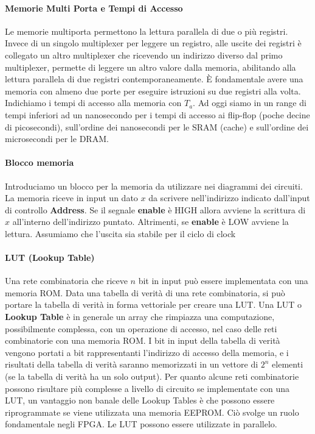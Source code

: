 \paragraph{Memorie Multi Porta e Tempi di Accesso}
Le memorie multiporta permettono la lettura parallela di due o più registri.
Invece di un singolo multiplexer per leggere un registro, alle uscite dei
registri è collegato un altro multiplexer che ricevendo un indirizzo diverso dal
primo multiplexer, permette di leggere un altro valore dalla memoria, abilitando
alla lettura parallela di due registri contemporaneamente. È fondamentale avere
una memoria con almeno due porte per eseguire istruzioni su due registri alla
volta. Indichiamo i tempi di accesso alla memoria con $ T_a $. Ad oggi siamo in
un range di tempi inferiori ad un nanosecondo per i tempi di accesso ai
flip-flop (poche decine di picosecondi), sull'ordine dei nanosecondi per le SRAM
(cache) e sull'ordine dei microsecondi per le DRAM.



\paragraph{Blocco memoria}
Introduciamo un blocco per la memoria da utilizzare nei diagrammi dei circuiti.
La memoria riceve in input un dato $ x $ da scrivere nell'indirizzo indicato
dall'input di controllo \textbf{Address}. Se il segnale \textbf{enable} è HIGH
allora avviene la scrittura di $ x $ all'interno dell'indirizzo puntato.
Altrimenti, se \textbf{enable} è LOW avviene la lettura. Assumiamo che l'uscita
sia stabile per il ciclo di clock

\paragraph{LUT (Lookup Table)}
Una rete combinatoria che riceve $ n $ bit in input può essere implementata con
una memoria ROM. Data una tabella di verità di una rete combinatoria, si può
portare la tabella di verità in forma vettoriale per creare una LUT. Una LUT o
\textbf{Lookup Table} è in generale un array che rimpiazza una computazione,
possibilmente complessa, con un operazione di accesso, nel caso delle reti
combinatorie con una memoria ROM. I bit in input della tabella di verità vengono
portati a bit rappresentanti l'indirizzo di accesso della memoria, e i risultati
della tabella di verità saranno memorizzati in un vettore di $ 2^n $ elementi
(se la tabella di verità ha un solo output). Per quanto alcune reti combinatorie
possono risultare più complesse a livello di circuito se implementate con una
LUT, un vantaggio non banale delle Lookup Tables è che possono essere
riprogrammate se viene utilizzata una memoria EEPROM. Ciò svolge un ruolo
fondamentale negli FPGA. Le LUT possono essere utilizzate in parallelo.


